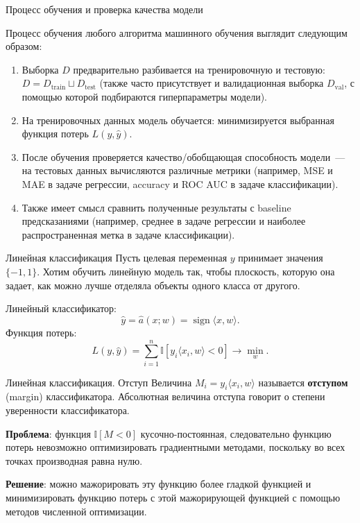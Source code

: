 \documentclass[notheorems, handout]{beamer}
\begin{document}
\begin{frame}{Процесс обучения и проверка качества модели}

	Процесс обучения любого алгоритма машинного обучения выглядит следующим образом:
	\begin{enumerate}
		\item Выборка $D$ предварительно разбивается на тренировочную и тестовую: $D=D_\text{train} \sqcup D_\text{test}$ (также часто присутствует и валидационная выборка $D_\text{val}$, с помощью которой подбираются гиперпараметры модели).\medskip
		\item На тренировочных данных модель обучается: минимизируется выбранная функция потерь $L(y, \hat y)$.\medskip
		\item После обучения проверяется качество/обобщающая способность модели~--- на тестовых данных вычисляются различные метрики (например, MSE и MAE в задаче регрессии, accuracy и ROC AUC в задаче классификации).\medskip
		\item Также имеет смысл сравнить полученные результаты с baseline предсказаниями (например, среднее в задаче регрессии и наиболее распространенная метка в задаче классификации). 
	\end{enumerate}
\end{frame}

\begin{frame}{Линейная классификация}
	Пусть целевая переменная $y$ принимает значения $\{-1, 1\}$. Хотим обучить линейную модель так, чтобы плоскость, которую она задает, как можно лучше отделяла объекты одного класса от другого.\medskip

	Линейный классификатор:
	\[
		\hat y = \hat a(x; w) = \operatorname{sign} \langle x, w\rangle.
	\]
	Функция потерь:
	\[
		L(y, \hat{y}) = \sum_{i=1}^{n}\mathbb{I}[y_i \langle x_i, w\rangle < 0] \longrightarrow \min_{w}.
	\]
\end{frame}

\begin{frame}{Линейная классификация. Отступ}
	Величина $M_i=y_i \langle x_i, w\rangle$ называется \textbf{отступом} (margin) классификатора. Абсолютная величина отступа говорит о степени уверенности классификатора.\medskip

	\textbf{Проблема}: функция $\mathbb{I}[M < 0]$ кусочно-постоянная, следовательно функцию потерь невозможно оптимизировать градиентными методами, поскольку во всех точках производная равна нулю.\medskip

	\textbf{Решение}: можно мажорировать эту функцию более гладкой функцией и минимизировать функцию потерь с этой мажорирующей функцией с помощью методов численной оптимизации.
\end{frame}
\end{document}
